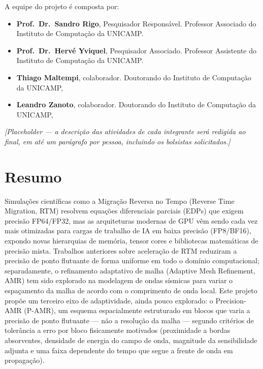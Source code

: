 \documentclass[12pt,a4paper]{article}
\newcommand{\pamr}{P\nobreakdash-AMR}
\begin{document}
A equipe do projeto é composta por:

\begin{itemize}
  \item \textbf{Prof.\ Dr.\ Sandro Rigo}, Pesquisador Responsável. Professor
        Associado do Instituto de Computação da UNICAMP.
  \item \textbf{Prof.\ Dr.\ Hervé Yviquel}, Pesquisador Associado. Professor
        Assistente do Instituto de Computação da UNICAMP.
  \item \textbf{Thiago Maltempi}, colaborador. Doutorando
        do Instituto de Computação da UNICAMP, 
  \item \textbf{Leandro Zanoto}, colaborador. Doutorando
        do Instituto de Computação da UNICAMP,
\end{itemize}


\emph{[Placeholder --- a descrição das atividades de cada integrante será
redigida ao final, em até um parágrafo por pessoa, incluindo os bolsistas
solicitados.]}

\iffalse

\section*{Resumo}

Simulações científicas como a Migração Reversa no Tempo (Reverse Time
Migration, RTM) resolvem equações diferenciais parciais (EDPs) que exigem
precisão FP64/FP32, mas as arquiteturas modernas de GPU vêm sendo cada vez mais
otimizadas para cargas de trabalho de IA em baixa precisão (FP8/BF16),
expondo novas hierarquias de memória, tensor cores e bibliotecas matemáticas de
precisão mista. Trabalhos anteriores sobre aceleração de RTM reduziram a
precisão de ponto flutuante de forma uniforme em todo o domínio computacional;
separadamente, o refinamento adaptativo de malha (Adaptive Mesh Refinement,
AMR) tem sido explorado na modelagem de ondas sísmicas para variar o
espaçamento da malha de acordo com o comprimento de onda local. Este projeto
propõe um terceiro eixo de adaptividade, ainda pouco explorado: o
Precision-AMR (\pamr{}), um esquema espacialmente estruturado em blocos que
varia a precisão de ponto flutuante --- não a resolução da malha --- segundo
critérios de tolerância a erro por bloco fisicamente motivados (proximidade a
bordas absorventes, densidade de energia do campo de onda, magnitude da
sensibilidade adjunta e uma faixa dependente do tempo que segue a frente de
onda em propagação).
\end{document}
